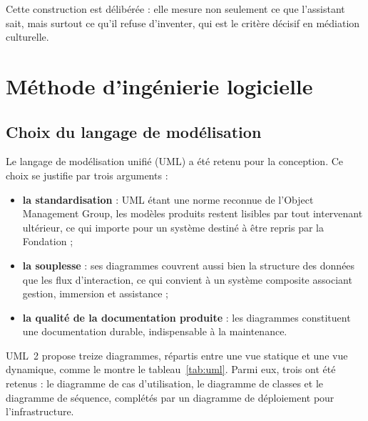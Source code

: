 Cette construction est délibérée : elle mesure non seulement ce que l'assistant
sait, mais surtout ce qu'il refuse d'inventer, qui est le critère décisif en
médiation culturelle.

\section{Méthode d'ingénierie logicielle}
\label{sec:2tup}

\subsection{Choix du langage de modélisation}

Le langage de modélisation unifié (UML) a été retenu pour la conception. Ce
choix se justifie par trois arguments :

\begin{itemize}
  \item \textbf{la standardisation} : UML étant une norme reconnue de l'Object
        Management Group, les modèles produits restent lisibles par tout
        intervenant ultérieur, ce qui importe pour un système destiné à être
        repris par la Fondation ;
  \item \textbf{la souplesse} : ses diagrammes couvrent aussi bien la structure
        des données que les flux d'interaction, ce qui convient à un système
        composite associant gestion, immersion et assistance ;
  \item \textbf{la qualité de la documentation produite} : les diagrammes
        constituent une documentation durable, indispensable à la maintenance.
\end{itemize}

UML~2 propose treize diagrammes, répartis entre une vue statique et une vue
dynamique, comme le montre le tableau~\ref{tab:uml}. Parmi eux, trois ont été
retenus : le diagramme de cas d'utilisation, le diagramme de classes et le
diagramme de séquence, complétés par un diagramme de déploiement pour
l'infrastructure.

